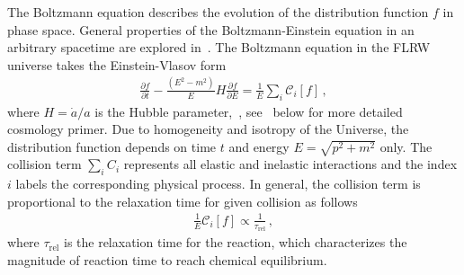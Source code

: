 The Boltzmann equation describes the evolution of the distribution function $f$ in phase space. General properties of the Boltzmann-Einstein equation in an arbitrary spacetime are explored in~. The Boltzmann equation in the FLRW universe takes the Einstein-Vlasov form
\begin{align}\label{Hubble:Boltzmann}
\frac{\partial f}{\partial t}-\frac{\left(E^2-m^2\right)}{E}H\frac{\partial f}{\partial E}=\frac{1}{E}\sum_{i}\mathcal{C}_i[f]\,,
\end{align}
where $H=\dot{a}/a$ is the Hubble parameter,~, see~ below for more detailed cosmology primer. Due to homogeneity and isotropy of the Universe, the distribution function depends on time $t$ and energy $E=\sqrt{p^2+m^2}$ only. The collision term $\sum_i C_i$ represents all elastic and inelastic interactions and the index $i$ labels the corresponding physical process. In general, the collision term is proportional to the relaxation time for given collision as follows~\cite{Anderson:1974nyl}
\begin{align}
\frac{1}{E}\mathcal{C}_i[f]\propto\frac{1}{\tau_\mathrm{rel}}\,,
\end{align}
where $\tau_\mathrm{rel}$ is the relaxation time for the reaction, which characterizes the magnitude of reaction time to reach chemical equilibrium. 

